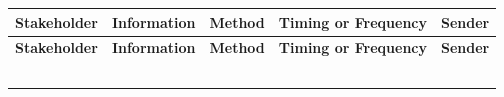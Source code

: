 \documentclass[10pt,letterpaper]{article}
\renewcommand\arraystretch{1.25}
\begin{document}
\begin{center}
\begingroup
\setlength\tabcolsep{2.0pt}
\footnotesize
\renewcommand\arraystretch{1.55}
\begin{longtable}{|>{\raggedright\arraybackslash}p{1.220in}|>{\raggedright\arraybackslash}p{1.220in}|>{\raggedright\arraybackslash}p{1.220in}|>{\raggedright\arraybackslash}p{1.220in}|>{\raggedright\arraybackslash}p{1.220in}|}
\hline
\rowcolor{light}
\textbf{Stakeholder} & \textbf{Information} & \textbf{Method} & \textbf{Timing or Frequency} & \textbf{Sender} \\ \hline
\endfirsthead
\hline\rowcolor{light} \textbf{Stakeholder} & \textbf{Information} & \textbf{Method} & \textbf{Timing or Frequency} & \textbf{Sender} \\ \hline
\endhead
\rule{0pt}{11pt}\hspace{0pt} & \rule{0pt}{11pt}\hspace{0pt} & \rule{0pt}{11pt}\hspace{0pt} & \rule{0pt}{11pt}\hspace{0pt} & \rule{0pt}{11pt}\hspace{0pt} \\ \hline
\rule{0pt}{11pt}\hspace{0pt} & \rule{0pt}{11pt}\hspace{0pt} & \rule{0pt}{11pt}\hspace{0pt} & \rule{0pt}{11pt}\hspace{0pt} & \rule{0pt}{11pt}\hspace{0pt} \\ \hline
\rule{0pt}{11pt}\hspace{0pt} & \rule{0pt}{11pt}\hspace{0pt} & \rule{0pt}{11pt}\hspace{0pt} & \rule{0pt}{11pt}\hspace{0pt} & \rule{0pt}{11pt}\hspace{0pt} \\ \hline
\rule{0pt}{11pt}\hspace{0pt} & \rule{0pt}{11pt}\hspace{0pt} & \rule{0pt}{11pt}\hspace{0pt} & \rule{0pt}{11pt}\hspace{0pt} & \rule{0pt}{11pt}\hspace{0pt} \\ \hline
\rule{0pt}{11pt}\hspace{0pt} & \rule{0pt}{11pt}\hspace{0pt} & \rule{0pt}{11pt}\hspace{0pt} & \rule{0pt}{11pt}\hspace{0pt} & \rule{0pt}{11pt}\hspace{0pt} \\ \hline
\end{longtable}
\endgroup
\end{center}
\end{document}
